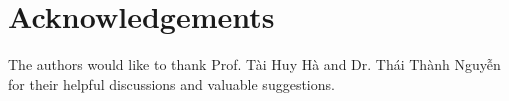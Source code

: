 \documentclass[11pt,reqno,a4paper]{amsart}
\theoremstyle{definition}
\begin{document}
\section*{Acknowledgements}
\noindent 
The authors would like to thank Prof. T\`{a}i Huy H\`{a}  and  Dr. Thái Thành  Nguy\~{\^e}n
for their helpful discussions and valuable suggestions.
\end{document}
